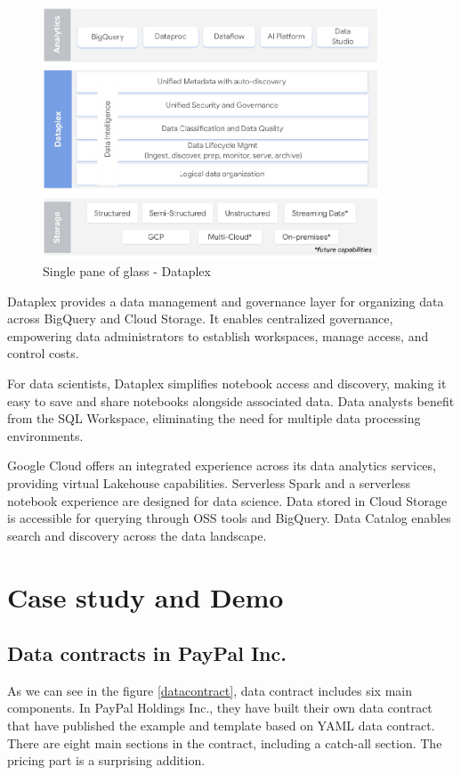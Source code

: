 \documentclass[12pt, a4paper]{book}
\begin{document}
\begin{figure}[h]
	\begin{framed}
		\centering
		\includegraphics[width=10cm]{Dataplex.png}
		\caption{Single pane of glass - Dataplex}
		\label{Dataplex}
	\end{framed}
\end{figure}

Dataplex provides a data management and governance layer for organizing data across BigQuery and Cloud Storage. It enables centralized governance, empowering data administrators to establish workspaces, manage access, and control costs.

For data scientists, Dataplex simplifies notebook access and discovery, making it easy to save and share notebooks alongside associated data. Data analysts benefit from the SQL Workspace, eliminating the need for multiple data processing environments.

Google Cloud offers an integrated experience across its data analytics services, providing virtual Lakehouse capabilities. Serverless Spark and a serverless notebook experience are designed for data science. Data stored in Cloud Storage is accessible for querying through OSS tools and BigQuery. Data Catalog enables search and discovery across the data landscape.

\section{Case study and Demo}
\subsection{Data contracts in PayPal Inc.}
As we can see in the figure \ref{datacontract}, data contract includes six main components. In PayPal Holdings Inc., they have built their own data contract that have published the example and template based on YAML data contract. There are eight main sections in the contract, including a catch-all section. The pricing part is a surprising addition.
\end{document}
